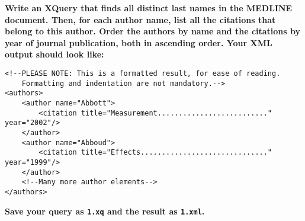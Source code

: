 \documentclass[a4paper, 12pt]{scrartcl}
\begin{document}
\noindent \textbf{Write an XQuery that finds all distinct last names in the MEDLINE document. Then, for each author name, list all the citations that belong to this author. Order the authors by name and the citations by year of journal publication, both in ascending order. Your XML output should look like:} \\

\lstset{language=XML}
\begin{lstlisting}
<!--PLEASE NOTE: This is a formatted result, for ease of reading.
    Formatting and indentation are not mandatory.-->
<authors>
    <author name="Abbott">
        <citation title="Measurement.........................." year="2002"/>
    </author>
    <author name="Abboud">
        <citation title="Effects.............................." year="1999"/>
    </author>
    <!--Many more author elements-->
</authors>
\end{lstlisting}

\noindent \textbf{Save your query as \texttt{1.xq} and the result as \texttt{1.xml}.}
\end{document}
